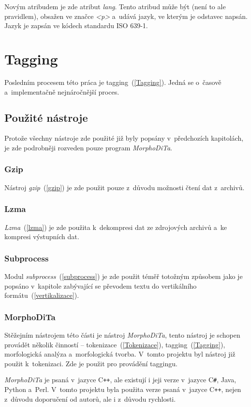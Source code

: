 Novým atribudem je zde atribut \textit{lang}. Tento atribud může být (není to ale pravidlem), obsažen ve značce
\textit{<p>} a~udává jazyk, ve kterým je odstavec napsán. Jazyk je zapsán ve kódech standardu ISO 639-1.

\chapter{Tagging}
Posledním procesem této práca je tagging~(\ref{Tagging}). Jedná se o~časově a~implementačně
nejnáročnější proces.

\section{Použité nástroje}
Protože všechny nástroje zde použité již byly popsány v~předchozích kapitolách, je zde podrobněji
rozveden pouze program \textit{MorphoDiTa}.

\subsection{Gzip}
Nástroj \textit{gzip}~(\ref{gzip}) je zde použit pouze z~důvodu možnosti čtení dat z~archivů.

\subsection{Lzma}
\textit{Lzma}~(\ref{lzma}) je zde použita k~dekompresi dat ze zdrojových archivů a~ke kompresi výstupních dat.

\subsection{Subprocess}
Modul \textit{subprocess}~(\ref{subprocess}) je zde použit téměř totožným způsobem jako je popsáno v~kapitole zabývající
se převodem textu do vertikálního formátu~(\ref{vertikalizace}).

\subsection{MorphoDiTa}
\label{morphodita}
Stěžejním nástrojem této části je nástroj \textit{MorphoDiTa}, tento nástroj je schopen provádět
několik činností -- tokenizace~(\ref{Tokenizace}), tagging~(\ref{Tagging}), morfologická analýza a~morfologická tvorba. V~tomto projektu
byl nástroj již použit k~tokenizaci. Zde je použit pro provádění taggingu.

\textit{MorphoDiTa} je psaná v~jazyce C\texttt{++}, ale existují i jeji verze v~jazyce C\texttt{\#}, Java,
Python a~Perl. V~tomto projektu byla použita verze psaná v~jazyce C\texttt{++}, nejen z~důvodu doporučení od autorů, ale
i z~důvodu rychlosti.

